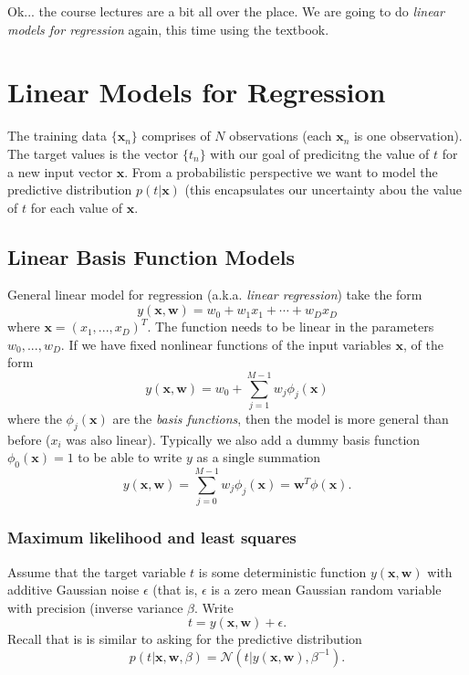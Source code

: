 \documentclass[twoside]{article}
\newcommand\x{\mathbf{x}}
\newcommand\w{\mathbf{w}}
\newcommand\N{\mathcal{N}}
\begin{document}
Ok... the course lectures are a bit all over the place. We are going to do \emph{linear models for regression} again, this time using the textbook.

\section{Linear Models for Regression}
The training data $\{\x_n\}$ comprises of $N$ observations (each $\x_n$ is one observation). The target values is the vector $\{t_n\}$ with our goal of predicitng the value of $t$ for a new input vector $\x$. From a probabilistic perspective we want to model the predictive distribution $p(t | \x)$ (this encapsulates our uncertainty abou the value of $t$ for each value of $\x$. 

\subsection{Linear Basis Function Models}
General linear model for regression (a.k.a. \emph{linear regression}) take the form
\[y(\x, \w) = w_0 + w_1x_1 + \cdots + w_{D}x_{D}\]
where $\x = (x_1, ..., x_D)^T$. The function needs to be linear in the parameters $w_0, ..., w_D$. If we have fixed nonlinear functions of the input variables $\x$, of the form
\[y(\x, \w) = w_0 + \sum^{M-1}_{j=1}w_j \phi_j(\x)\]
where the $\phi_j(\x)$ are the \emph{basis functions}, then the model is more general than before ($x_i$ was also linear). Typically we also add a dummy basis function $\phi_0(\x) = 1$ to be able to write $y$ as a single summation
\[y(\x, \w) = \sum^{M-1}_{j=0}w_j\phi_j(\x) = \w^T\phi(\x).\]

\subsubsection{Maximum likelihood and least squares}
Assume that the target variable $t$ is some deterministic function $y(\x, \w)$ with additive Gaussian noise $\epsilon$ (that is, $\epsilon$ is a zero mean Gaussian random variable with precision (inverse variance $\beta$. Write
\[t = y(\x, \w) + \epsilon.\]
Recall that is is similar to asking for the predictive distribution
\[p(t | \x, \w, \beta) = \N(t| y(\x, \w), \beta^{-1}).\] 
\end{document}
